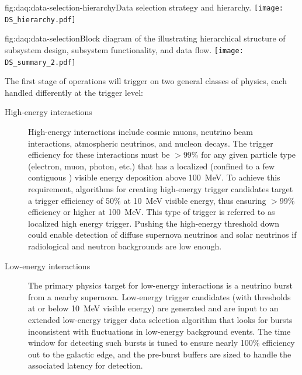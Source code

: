 \begin{dunefigure}{fig:daq:data-selection-hierarchy}{Data selection
    strategy and hierarchy.}
 \texttt{[image: DS\_hierarchy.pdf]}
\end{dunefigure}

\begin{dunefigure}{fig:daq:data-selection}{Block diagram of the  
     illustrating hierarchical structure of
    subsystem design, subsystem functionality, and data flow.}
  \texttt{[image: DS\_summary\_2.pdf]}
\end{dunefigure}

The first stage of   operations will trigger on two general
classes of physics, each handled differently at the trigger level:

\begin{description}
\item[High-energy interactions] High-energy interactions include cosmic muons, neutrino beam interactions, atmospheric neutrinos, and nucleon decays. 
  The trigger efficiency for these interactions must be $>$99\% for any given particle type (electron, muon, photon, etc.) that has a localized (confined to a few contiguous ) visible energy deposition above \SI{100}{\MeV}.
  To achieve this requirement, algorithms for creating high-energy trigger candidates  target a trigger efficiency of 50\% at \SI{10}{\MeV} visible energy, thus ensuring $>$99\% efficiency or higher at \SI{100}{\MeV}.
  This type of trigger is referred to as localized high energy trigger.
  Pushing the high-energy threshold down could enable detection of diffuse supernova neutrinos and solar neutrinos if radiological and neutron backgrounds are low enough.

\item[Low-energy interactions] The primary physics target for
  low-energy interactions is a neutrino burst from a nearby supernova. 
  Low-energy trigger candidates (with thresholds at or below
  \SI{10}{\MeV} visible energy) are generated and are input to an
  extended low-energy trigger data selection algorithm that looks for bursts inconsistent with fluctuations in low-energy background events. 
  The time window for detecting such bursts is tuned to ensure
  nearly 100\% efficiency out to the galactic edge, and the pre-burst
  buffers are sized to handle the associated latency for detection.

\end{description}

